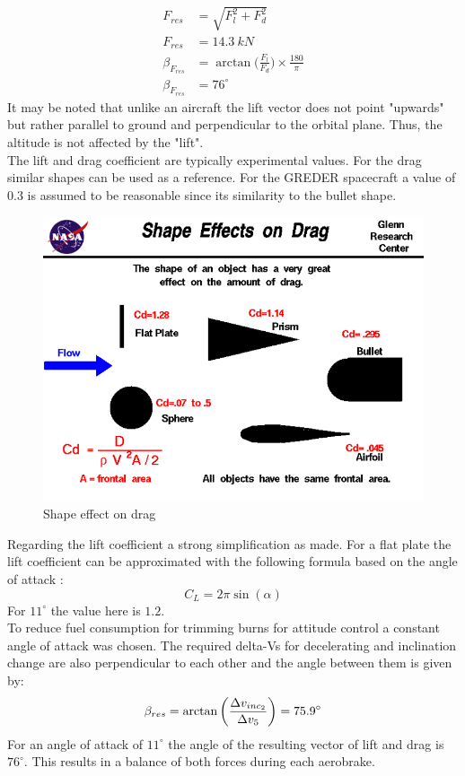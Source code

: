 \begin{align}
	F_{res} &= \sqrt{F_l^2+F_d^2}\\
	F_{res} &= 14.3\ kN\\
	\beta_{F_{res}} &=\arctan\bigg(\frac{F_l}{F_d}\bigg)\times\frac{180}\pi\\
	\beta_{F_{res}} &=76^\circ
\end{align}
It may be noted that unlike an aircraft the lift vector does not point "upwards" but rather parallel to ground and perpendicular to the orbital plane. Thus, the altitude is not affected by the "lift".\\

The lift and drag coefficient are typically experimental values. For the drag similar shapes can be used as a reference. For the GREDER spacecraft a value of $0.3$ is assumed to be reasonable since its similarity to the bullet shape. 
\begin{figure}[H]
	\centering\includegraphics[width=0.7\linewidth]{shapedrag}
	\caption{Shape effect on drag}
\end{figure}
Regarding the lift coefficient a strong simplification as made. For a flat plate the lift coefficient can be approximated with the following formula based on the angle of attack :
\begin{equation}
	C_L = 2\pi\sin(\alpha)
\end{equation}
For $11^\circ$ the value here is $1.2$.\\

To reduce fuel consumption for trimming burns for attitude control a constant angle of attack was chosen. The required delta-Vs for decelerating and inclination change are also perpendicular to each other and the angle between them is given by:
\begin{equation}
	\beta_{res}=\arctan\bigg(\frac{\Delta v_{inc_2}}{\Delta v_5}\bigg) = 75.9^\circ\\
\end{equation}
For an angle of attack of $11^\circ$ the angle of the resulting vector of lift and drag is $76^\circ$. This results in a balance of both forces during each aerobrake.\\

